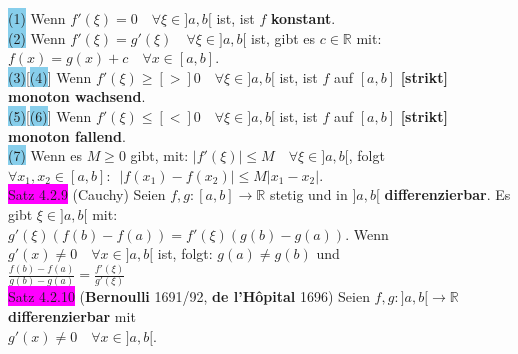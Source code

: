 \documentclass[10pt]{article}
\begin{document}
        \indent \colorbox{SkyBlue}{(1)} Wenn 
                \textcolor{NavyBlue}{$f'(\xi)=0\quad\forall\xi\in]a,b[$} ist, 
                ist \textcolor{NavyBlue}{$f$} \textbf{konstant}. \\
        \indent \colorbox{SkyBlue}{(2)} Wenn 
                \textcolor{NavyBlue}{$f'(\xi)=g'(\xi)\quad\forall\xi\in]a,b[$} ist, 
                gibt es \textcolor{NavyBlue}{$c\in\mathbb{R}$} mit: 
                \textcolor{NavyBlue}{$f(x)=g(x)+c\quad\forall x\in[a,b]$}. \\
        \indent \colorbox{SkyBlue}{(3)}[\colorbox{SkyBlue}{(4)}] 
                Wenn \textcolor{NavyBlue}{$f'(\xi)\geqslant[>]0\quad\forall\xi\in]a,b[$} ist, 
                ist \textcolor{NavyBlue}{$f$} auf \textcolor{NavyBlue}{$[a,b]$} 
                \textbf{[strikt] monoton wachsend}. \\
        \indent \colorbox{SkyBlue}{(5)}[\colorbox{SkyBlue}{(6)}] 
                Wenn \textcolor{NavyBlue}{$f'(\xi)\leqslant[<]0\quad\forall\xi\in]a,b[$} ist, 
                ist \textcolor{NavyBlue}{$f$} auf \textcolor{NavyBlue}{$[a,b]$} 
                \textbf{[strikt] monoton fallend}. \\
        \indent \colorbox{SkyBlue}{(7)} Wenn es \textcolor{NavyBlue}{$M\geqslant0$} gibt, mit: 
                \textcolor{NavyBlue}{$|f'(\xi)|\leqslant M\quad\forall\xi\in]a,b[$}, 
                folgt \textcolor{NavyBlue}{ 
                $\forall x_1,x_2\in[a,b]:\enspace|f(x_1)-f(x_2)|\leqslant M|x_1-x_2|$}. \\
\colorbox{magenta}{Satz 4.2.9} (Cauchy) Seien 
                \textcolor{NavyBlue}{$f,g:[a,b]\longrightarrow\mathbb{R}$}
                stetig und in \textcolor{NavyBlue}{$]a,b[$} \textbf{differenzierbar}.
                Es gibt \textcolor{NavyBlue}{$\xi\in]a,b[$} mit: \\
        \indent \textcolor{NavyBlue}{$g'(\xi)(f(b)-f(a))=f'(\xi)(g(b)-g(a))$}. 
                Wenn \textcolor{NavyBlue}{$g'(x)\neq0\quad\forall x\in]a,b[$} 
                ist, folgt: \textcolor{NavyBlue}{$g(a)\neq g(b)$} und \\
        \indent \textcolor{NavyBlue}{$\frac{f(b)-f(a)}{g(b)-g(a)}=\frac{f'(\xi)}{g'(\xi)}$} \\
\colorbox{magenta}{Satz 4.2.10} (\textbf{Bernoulli} 1691/92, \textbf{de l'Hôpital} 1696) 
                Seien \textcolor{NavyBlue}{$f,g:]a,b[\longrightarrow\mathbb{R}$} 
                \textbf{differenzierbar} mit \\
        \indent \textcolor{NavyBlue}{$g'(x)\neq0\quad\forall x\in]a,b[$}. 
\end{document}
